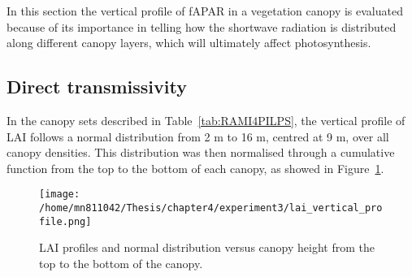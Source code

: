\documentclass[a4paper,11pt]{report}
\begin{document}
In this section the vertical profile of fAPAR in a vegetation canopy is evaluated because of its importance in telling how the shortwave radiation is distributed along different canopy layers, which will ultimately affect photosynthesis. 





\subsection{Direct transmissivity}

In the canopy sets described in Table~\ref{tab:RAMI4PILPS}, the vertical profile of LAI follows a normal distribution from 2 m to 16 m, centred at 9 m, over all canopy densities. This distribution was then normalised through a cumulative function from the top to the bottom of each canopy, as showed in Figure~\ref{f:laiprof}.

\begin{figure}[ht!]
\centering
\texttt{[image: /home/mn811042/Thesis/chapter4/experiment3/lai\_vertical\_profile.png]}
\caption{LAI profiles and normal distribution versus canopy height from the top to the bottom of the canopy.}
\label{f:laiprof}
\end{figure}
\end{document}
